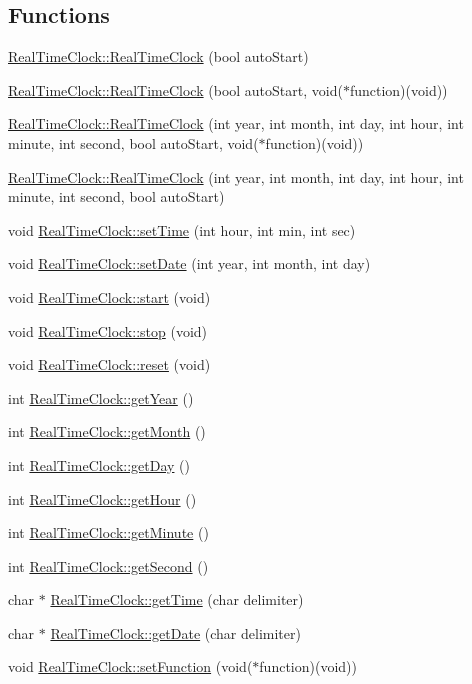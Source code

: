 \subsection*{Functions}
\begin{DoxyCompactItemize}
\item 
\hyperlink{group__group9_ga02c3e799d7541e2917ef46e71146ed90}{RealTimeClock::RealTimeClock} (bool autoStart)
\item 
\hyperlink{group__group9_ga81b623ff865ffad3a60defab000f84f5}{RealTimeClock::RealTimeClock} (bool autoStart, void($\ast$function)(void))
\item 
\hyperlink{group__group9_gadf73852d127f70e8cb37a83b206644e9}{RealTimeClock::RealTimeClock} (int year, int month, int day, int hour, int minute, int second, bool autoStart, void($\ast$function)(void))
\item 
\hyperlink{group__group9_gaad2bfb64a40a2a2729b569c08e7dcc49}{RealTimeClock::RealTimeClock} (int year, int month, int day, int hour, int minute, int second, bool autoStart)
\item 
void \hyperlink{group__group9_ga14ecce7648b24c7a85359af3f5b20af6}{RealTimeClock::setTime} (int hour, int min, int sec)
\item 
void \hyperlink{group__group9_ga4a5781efbfce128e0d3c461627ce371b}{RealTimeClock::setDate} (int year, int month, int day)
\item 
void \hyperlink{group__group9_gab62814ef94d0fe081e1f8a2756317a3c}{RealTimeClock::start} (void)
\item 
void \hyperlink{group__group9_ga116ebd0f42df71ef71d217527194d867}{RealTimeClock::stop} (void)
\item 
void \hyperlink{group__group9_ga81b09971229ddc88a7581bf5dcab7d1e}{RealTimeClock::reset} (void)
\item 
int \hyperlink{group__group9_ga58d426541706593b83016e0462e41625}{RealTimeClock::getYear} ()
\item 
int \hyperlink{group__group9_gaa8901871334c623b9473216de08c1432}{RealTimeClock::getMonth} ()
\item 
int \hyperlink{group__group9_ga29dbb224e31f5dca34c29e5e48ebeb2c}{RealTimeClock::getDay} ()
\item 
int \hyperlink{group__group9_ga86c10ef9f4da8dbee7fbd6236443fd53}{RealTimeClock::getHour} ()
\item 
int \hyperlink{group__group9_ga9784205a5ea194cca976af6cfee1308b}{RealTimeClock::getMinute} ()
\item 
int \hyperlink{group__group9_gaaddd01287cb8a6d2711b0650f7cbcc72}{RealTimeClock::getSecond} ()
\item 
char $\ast$ \hyperlink{group__group9_gaad4ca0e261b2a594e536303dee1116f4}{RealTimeClock::getTime} (char delimiter)
\item 
char $\ast$ \hyperlink{group__group9_gaa11261523ee392adf9081def9e3b1fcd}{RealTimeClock::getDate} (char delimiter)
\item 
void \hyperlink{group__group9_ga7b9d631751b1b21a8d22dd1599f7de43}{RealTimeClock::setFunction} (void($\ast$function)(void))
\end{DoxyCompactItemize}


